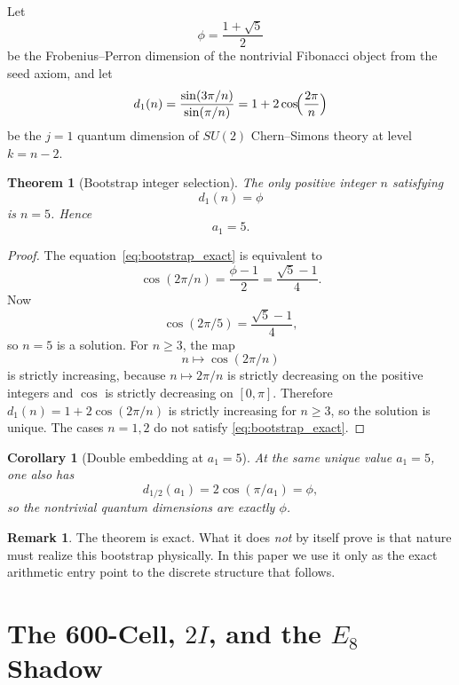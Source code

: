 \documentclass[12pt,a4paper]{article}
\newtheorem{theorem}{Theorem}
\newtheorem{corollary}{Corollary}
\theoremstyle{definition}
\newtheorem{remark}{Remark}
\begin{document}
Let
\begin{equation}
\phi=\frac{1+\sqrt{5}}{2}
\end{equation}
be the Frobenius--Perron dimension of the nontrivial Fibonacci object from
the seed axiom, and let
\begin{equation}
d_1(n)=\frac{\sin(3\pi/n)}{\sin(\pi/n)}=1+2\cos\!\Bigl(\frac{2\pi}{n}\Bigr)
\end{equation}
be the $j=1$ quantum dimension of $SU(2)$ Chern--Simons theory at level $k=n-2$.

\begin{theorem}[Bootstrap integer selection]
\label{thm:bootstrap_exact}
The only positive integer $n$ satisfying
\begin{equation}
d_1(n)=\phi
\label{eq:bootstrap_exact}
\end{equation}
is $n=5$.  Hence
\[
a_1=5.
\]
\end{theorem}

\begin{proof}
The equation~\eqref{eq:bootstrap_exact} is equivalent to
\[
\cos(2\pi/n)=\frac{\phi-1}{2}=\frac{\sqrt{5}-1}{4}.
\]
Now
\[
\cos(2\pi/5)=\frac{\sqrt{5}-1}{4},
\]
so $n=5$ is a solution.  For $n\ge 3$, the map
\[
n\mapsto \cos(2\pi/n)
\]
is strictly increasing, because $n\mapsto 2\pi/n$ is strictly decreasing on
the positive integers and $\cos$ is strictly decreasing on $[0,\pi]$.
Therefore $d_1(n)=1+2\cos(2\pi/n)$ is strictly increasing for $n\ge 3$,
so the solution is unique.  The cases $n=1,2$ do not satisfy
\eqref{eq:bootstrap_exact}.
\end{proof}

\begin{corollary}[Double embedding at \texorpdfstring{$a_1=5$}{a1=5}]
At the same unique value $a_1=5$, one also has
\[
d_{1/2}(a_1)=2\cos(\pi/a_1)=\phi,
\]
so the nontrivial quantum dimensions are exactly $\phi$.
\end{corollary}

\begin{remark}
The theorem is exact.  What it does \emph{not} by itself prove is that nature must realize this bootstrap physically.  In this paper we use it only as the exact arithmetic entry point to the discrete structure that follows.
\end{remark}

\section{The 600-Cell, \texorpdfstring{$2I$}{2I}, and the \texorpdfstring{$E_8$}{E8} Shadow}
\end{document}
